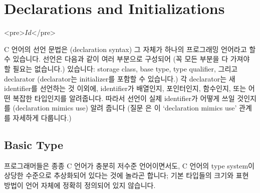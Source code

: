 \chapter{Declarations and Initializations}	\label{chap:decinit}

\begin{rawhtml}
<pre>$Id$</pre>
\end{rawhtml}

C 언어의 선언 문법은 (declaration syntax) 그 자체가 하나의 프로그래밍
언어라고 할 수 있습니다.  선언은 다음과 같이 여러 부분으로 구성되어 (꼭
모든 부분을 다 가져야 할 필요는 없습니다.) 있습니다: storage class,
base type, type qualifier, 그리고 declarator (declarator는 
initializer를 포함할 수 있습니다.)  각 declarator는 새 identifier를
선언하는 것 이외에, identifier가 배열인지, 포인터인지, 함수인지, 또는
어떤 복잡한 타입인지를 알려줍니다.  따라서 선언이 실제 identifier가
어떻게 쓰일 것인지를 (declaration mimics use) 알려 줍니다 (질문 은 이 
`declaration mimics use' 관계를 자세하게 다룹니다.)

\section{Basic Type}	\label{sec:bastype}
프로그래머들은 종종 C 언어가 충분히 저수준 언어이면서도, C 언어의
type system이 상당한 수준으로 추상화되어 있다는 것에 놀라곤 합니다;
기본 타입들의 크기와 표현 방법이 언어 자체에 정확히 정의되어 있지 않습니다.

